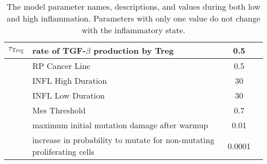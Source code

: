 \documentclass[11pt, a4paper, preprint]{article}
\begin{document}
\begin{table}[H]
\begin{center}
\begin{tabular}{|| c | p{7cm} | c | c ||}
  \hline
 $\tau_\text{Treg}$ & rate of TGF-$\beta$ production by Treg & 0.5 & \\
  \hline
  & RP Cancer Line  & 0.5 &  \\ 
 \hline
&  INFL High Duration & 30&   \\
 \hline
 & INFL Low Duration &30 &   \\
 \hline
& Mes Threshold & 0.7 &    \\
 \hline
  & maximum initial mutation damage after warmup  & 0.01 &\\
  \hline
  & increase in probability to mutate for non-mutating proliferating cells & 0.0001 & \\
  \hline
\end{tabular}
  \caption{The model parameter names, descriptions, and values during both low and high inflammation. Parameters with only one value do not change with the inflammatory state.}
\end{center}
\end{table}
\end{document}
